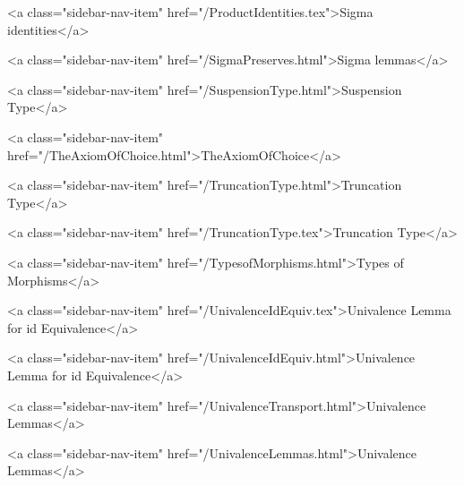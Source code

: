       
    
      
        
          <a class="sidebar-nav-item" href="/ProductIdentities.tex">Sigma identities</a>
        
      
    
      
        
          <a class="sidebar-nav-item" href="/SigmaPreserves.html">Sigma lemmas</a>
        
      
    
      
        
          <a class="sidebar-nav-item" href="/SuspensionType.html">Suspension Type</a>
        
      
    
      
        
          <a class="sidebar-nav-item" href="/TheAxiomOfChoice.html">TheAxiomOfChoice</a>
        
      
    
      
        
          <a class="sidebar-nav-item" href="/TruncationType.html">Truncation Type</a>
        
      
    
      
        
          <a class="sidebar-nav-item" href="/TruncationType.tex">Truncation Type</a>
        
      
    
      
        
          <a class="sidebar-nav-item" href="/TypesofMorphisms.html">Types of Morphisms</a>
        
      
    
      
        
          <a class="sidebar-nav-item" href="/UnivalenceIdEquiv.tex">Univalence Lemma for id Equivalence</a>
        
      
    
      
        
          <a class="sidebar-nav-item" href="/UnivalenceIdEquiv.html">Univalence Lemma for id Equivalence</a>
        
      
    
      
        
          <a class="sidebar-nav-item" href="/UnivalenceTransport.html">Univalence Lemmas</a>
        
      
    
      
        
          <a class="sidebar-nav-item" href="/UnivalenceLemmas.html">Univalence Lemmas</a>
        
